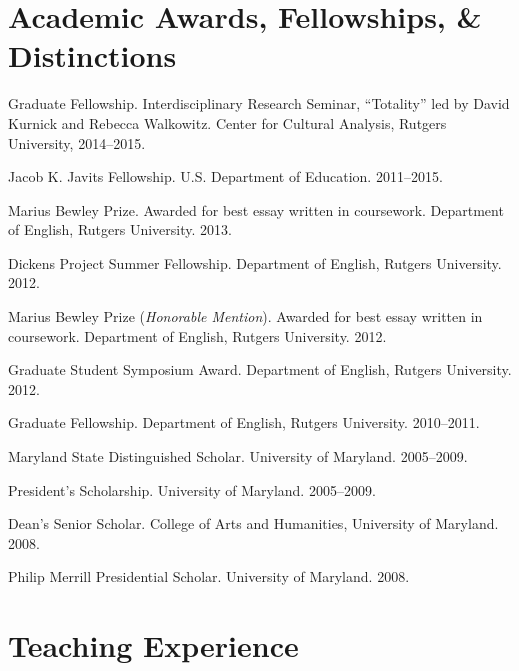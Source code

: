 \documentclass[10pt,letterpaper]{article}
\renewenvironment{itemize}{
  \begin{list}{}{
    \setlength{\leftmargin}{1.5em}
    \setlength{\itemsep}{0.25em}
    \setlength{\parskip}{0pt}
    \setlength{\parsep}{0.25em}
  }
}{
  \end{list}
}
\begin{document}

\section*{Academic Awards, Fellowships, \& Distinctions}

\begin{itemize}
\item Graduate Fellowship. Interdisciplinary Research Seminar, ``Totality'' led by David Kurnick and Rebecca Walkowitz. Center for Cultural Analysis, Rutgers University, 2014--2015.
\item Jacob K. Javits Fellowship. U.S. Department of Education. 2011--2015.
\item Marius Bewley Prize. Awarded for best essay written in coursework. Department of English, Rutgers University. 2013.
\item Dickens Project Summer Fellowship. Department of English, Rutgers University. 2012.
\item Marius Bewley Prize (\emph{Honorable Mention}). Awarded for best essay written in coursework. Department of English, Rutgers University. 2012.
\item Graduate Student Symposium Award. Department of English, Rutgers University. 2012.
\item Graduate Fellowship. Department of English, Rutgers University. 2010--2011.
\item Maryland State Distinguished Scholar. University of Maryland. 2005--2009.
\item President's Scholarship. University of Maryland. 2005--2009.
\item Dean's Senior Scholar. College of Arts and Humanities, University of Maryland. 2008.
\item Philip Merrill Presidential Scholar. University of Maryland. 2008.

\end{itemize}


\section*{Teaching Experience}
\end{document}
